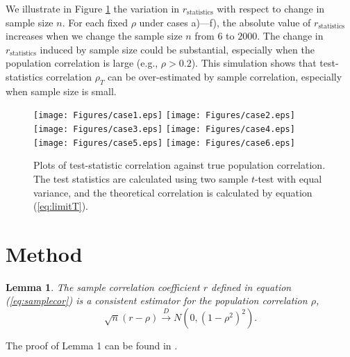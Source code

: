 \documentclass[12pt, a4paper]{article}
\newtheorem{lemma}{Lemma}
\begin{document}
We illustrate in Figure \ref{fig:tstat} the variation in $r_\text{statistics}$ with 
respect to change in sample size $n$. For each fixed $\rho$ under cases a)---f), the absolute 
value of $r_\text{statistics}$  increases when we change the sample size $n$ from $6$ to 
$2000$. The change in $r_\text{statistics}$ induced by sample size could be substantial, 
especially when the population correlation is large (e.g., $\rho > 0.2$). This simulation shows 
that test-statistics correlation $\rho_T$ can be over-estimated by sample correlation, 
especially when sample size is small.

\begin{figure}[!th]
	\centering
	\texttt{[image: Figures/case1.eps]}
	\texttt{[image: Figures/case2.eps]}
	\texttt{[image: Figures/case3.eps]}
	\texttt{[image: Figures/case4.eps]}
	\texttt{[image: Figures/case5.eps]}
	\texttt{[image: Figures/case6.eps]}
	\caption[Plots of test-statistic correlation against true population 
	correlation]{Plots of test-statistic correlation against true population 
		correlation. The test statistics are calculated 
		using two sample $t$-test with equal variance, and the theoretical correlation is 
		calculated by 
		equation (\ref{eq:limitT}).}
	\label{fig:tstat}
\end{figure}

	
	
	
	
	
	\section{Method}\label{section:testcormethod}
	
	\begin{lemma}
		The sample correlation coefficient $r$ defined in equation (\ref{eq:samplecor}) is a 
		consistent estimator for the population correlation $\rho$, 
		\[\sqrt{n}(r - \rho ) \stackrel{D}{\rightarrow}N\left(0, (1-\rho^2)^2\right).\]
	\end{lemma}
	The proof of Lemma 1 can be found in \citet{fisher1915frequency}. \\
	
\end{document}

